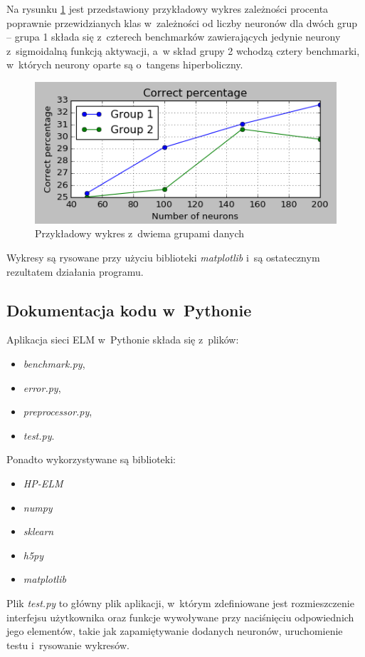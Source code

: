 \documentclass{article}
\begin{document}
Na rysunku \ref{przykladowy} jest przedstawiony przykładowy wykres zależności procenta poprawnie przewidzianych klas w~zależności od liczby neuronów dla dwóch grup -- grupa 1 składa się z~czterech benchmarków zawierających jedynie neurony z~sigmoidalną funkcją aktywacji, a~w skład grupy 2 wchodzą cztery benchmarki, w~których neurony oparte są o~tangens hiperboliczny. 
 
\begin{figure}[H]
\includegraphics[width=\textwidth]{przykladowy_wykres.png}
\caption{Przykładowy wykres z~dwiema grupami danych}
\label{przykladowy}
\end{figure}


Wykresy są rysowane przy użyciu biblioteki \textit{matplotlib} i~są ostatecznym rezultatem działania programu.

\subsection{Dokumentacja kodu w~Pythonie}
Aplikacja sieci ELM w~Pythonie składa się z~plików:
\begin{itemize}
\item \textit{benchmark.py},
\item \textit{error.py}, 
\item \textit{preprocessor.py},
\item \textit{test.py}.
\end{itemize}
Ponadto wykorzystywane są biblioteki:
\begin{itemize}
\item \textit{HP-ELM}
\item \textit{numpy}
\item \textit{sklearn}
\item \textit{h5py}
\item \textit{matplotlib}
\end{itemize}
Plik \textit{test.py} to główny plik aplikacji, w~którym zdefiniowane jest rozmieszczenie interfejsu użytkownika oraz funkcje wywoływane przy naciśnięciu odpowiednich jego elementów, takie jak zapamiętywanie dodanych neuronów, uruchomienie testu i~rysowanie wykresów.
\end{document}
